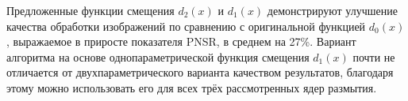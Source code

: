 Предложенные функции смещения $d_2\left(x\right)$ и $d_1\left(x\right)$ демонстрируют улучшение качества обработки изображений по сравнению с оригинальной функцией $d_0\left(x\right)$, выражаемое в приросте показателя PNSR, в среднем на 27\%. Вариант алгоритма на основе однопараметрической функция смещения $d_1\left(x\right)$ почти не отличается от двухпараметрического варианта качеством результатов, благодаря этому можно использовать его для всех трёх рассмотренных ядер размытия.

\FloatBarrier
